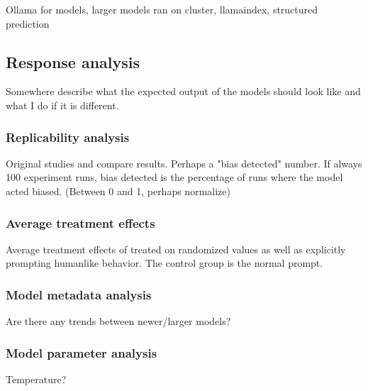 Ollama for models, larger models ran on cluster, llamaindex, structured prediction


\subsection{Response analysis}
Somewhere describe what the expected output of the models should look like and what I do if it is different.

\subsubsection{Replicability analysis}
Original studies and compare results. Perhaps a "bias detected" number. If always 100 experiment runs, bias detected is the percentage of runs where the model acted biased. (Between 0 and 1, perhaps normalize)

\subsubsection{Average treatment effects}
Average treatment effects of treated on randomized values as well as explicitly prompting humanlike behavior. The control group is the normal prompt.

\subsubsection{Model metadata analysis}
Are there any trends between newer/larger models?

\subsubsection{Model parameter analysis}
Temperature?